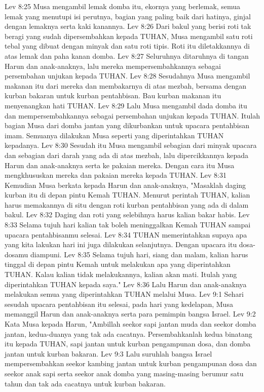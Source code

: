 Lev 8:25  Musa mengambil lemak domba itu, ekornya yang berlemak, semua lemak yang menutupi isi perutnya, bagian yang paling baik dari hatinya, ginjal dengan lemaknya serta kaki kanannya.
Lev 8:26  Dari bakul yang berisi roti tak beragi yang sudah dipersembahkan kepada TUHAN, Musa mengambil satu roti tebal yang dibuat dengan minyak dan satu roti tipis. Roti itu diletakkannya di atas lemak dan paha kanan domba.
Lev 8:27  Seluruhnya ditaruhnya di tangan Harun dan anak-anaknya, lalu mereka mempersembahkannya sebagai persembahan unjukan kepada TUHAN.
Lev 8:28  Sesudahnya Musa mengambil makanan itu dari mereka dan membakarnya di atas mezbah, bersama dengan kurban bakaran untuk kurban pentahbisan. Bau kurban makanan itu menyenangkan hati TUHAN.
Lev 8:29  Lalu Musa mengambil dada domba itu dan mempersembahkannya sebagai persembahan unjukan kepada TUHAN. Itulah bagian Musa dari domba jantan yang dikurbankan untuk upacara pentahbisan imam. Semuanya dilakukan Musa seperti yang diperintahkan TUHAN kepadanya.
Lev 8:30  Sesudah itu Musa mengambil sebagian dari minyak upacara dan sebagian dari darah yang ada di atas mezbah, lalu dipercikkannya kepada Harun dan anak-anaknya serta ke pakaian mereka. Dengan cara itu Musa mengkhususkan mereka dan pakaian mereka kepada TUHAN.
Lev 8:31  Kemudian Musa berkata kepada Harun dan anak-anaknya, "Masaklah daging kurban itu di depan pintu Kemah TUHAN. Menurut perintah TUHAN, kalian harus memakannya di situ dengan roti kurban pentahbisan yang ada di dalam bakul.
Lev 8:32  Daging dan roti yang selebihnya harus kalian bakar habis.
Lev 8:33  Selama tujuh hari kalian tak boleh meninggalkan Kemah TUHAN sampai upacara pentahbisanmu selesai.
Lev 8:34  TUHAN memerintahkan supaya apa yang kita lakukan hari ini juga dilakukan selanjutnya. Dengan upacara itu dosa-dosamu diampuni.
Lev 8:35  Selama tujuh hari, siang dan malam, kalian harus tinggal di depan pintu Kemah untuk melakukan apa yang diperintahkan TUHAN. Kalau kalian tidak melakukannya, kalian akan mati. Itulah yang diperintahkan TUHAN kepada saya."
Lev 8:36  Lalu Harun dan anak-anaknya melakukan semua yang diperintahkan TUHAN melalui Musa.
Lev 9:1  Sehari sesudah upacara pentahbisan itu selesai, pada hari yang kedelapan, Musa memanggil Harun dan anak-anaknya serta para pemimpin bangsa Israel.
Lev 9:2  Kata Musa kepada Harun, "Ambillah seekor sapi jantan muda dan seekor domba jantan, kedua-duanya yang tak ada cacatnya. Persembahkanlah kedua binatang itu kepada TUHAN, sapi jantan untuk kurban pengampunan dosa, dan domba jantan untuk kurban bakaran.
Lev 9:3  Lalu suruhlah bangsa Israel mempersembahkan seekor kambing jantan untuk kurban pengampunan dosa dan seekor anak sapi serta seekor anak domba yang masing-masing berumur satu tahun dan tak ada cacatnya untuk kurban bakaran.
